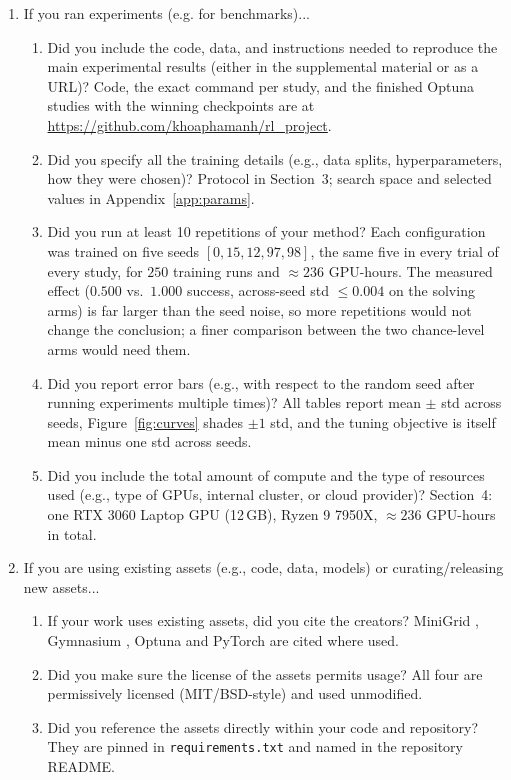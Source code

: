 \documentclass{article}
\begin{document}
\begin{enumerate}
\item If you ran experiments (e.g. for benchmarks)...
\begin{enumerate}
  \item Did you include the code, data, and instructions needed to reproduce the main experimental results (either in the supplemental material or as a URL)?
    \answerYes{} Code, the exact command per study, and the finished Optuna studies with the winning checkpoints are at \url{https://github.com/khoaphamanh/rl_project}.
  \item Did you specify all the training details (e.g., data splits, hyperparameters, how they were chosen)?
    \answerYes{} Protocol in Section~3; search space and selected values in Appendix~\ref{app:params}.
  \item Did you run at least 10 repetitions of your method?
    \answerNo{} Each configuration was trained on five seeds $[0,15,12,97,98]$, the same five in every trial of every study, for $250$ training runs and $\approx 236$ GPU-hours. The measured effect ($0.500$ vs.\ $1.000$ success, across-seed std $\le 0.004$ on the solving arms) is far larger than the seed noise, so more repetitions would not change the conclusion; a finer comparison between the two chance-level arms would need them.
  \item Did you report error bars (e.g., with respect to the random seed after running experiments multiple times)?
    \answerYes{} All tables report mean $\pm$ std across seeds, Figure~\ref{fig:curves} shades $\pm 1$ std, and the tuning objective is itself mean minus one std across seeds.
  \item Did you include the total amount of compute and the type of resources used (e.g., type of GPUs, internal cluster, or cloud provider)?
    \answerYes{} Section~4: one RTX 3060 Laptop GPU (12\,GB), Ryzen 9 7950X, $\approx 236$ GPU-hours in total.
\end{enumerate}

\item If you are using existing assets (e.g., code, data, models) or curating/releasing new assets...
\begin{enumerate}
  \item If your work uses existing assets, did you cite the creators?
    \answerYes{} MiniGrid \citep{minigrid}, Gymnasium \citep{gymnasium}, Optuna \citep{optuna} and PyTorch \citep{pytorch} are cited where used.
  \item Did you make sure the license of the assets permits usage?
    \answerYes{} All four are permissively licensed (MIT/BSD-style) and used unmodified.
  \item Did you reference the assets directly within your code and repository?
    \answerYes{} They are pinned in \texttt{requirements.txt} and named in the repository README.
\end{enumerate}
\end{enumerate}
\end{document}
